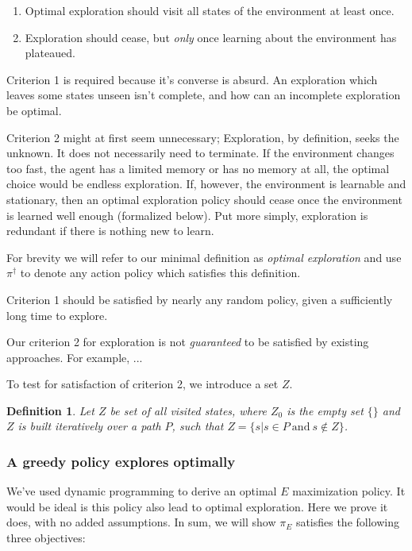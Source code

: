\documentclass[9pt,twocolumn,twoside]{pnas-new}
\newtheorem{definition}{Definition}
\begin{document}
\begin{enumerate}[noitemsep,wide=0pt,leftmargin=\dimexpr\labelwidth+2\labelsep\relax]
    \item Optimal exploration should visit all states of the environment at least once. 
    \item Exploration should cease, but \textit{only} once learning about the environment has plateaued. 
\end{enumerate}

Criterion 1 is required because it's converse is absurd. An exploration which leaves some states unseen isn't complete, and how can an incomplete exploration be optimal.

Criterion 2 might at first seem unnecessary; Exploration, by definition, seeks the unknown. It does not necessarily need to terminate. If the environment changes too fast, the agent has a limited memory or has no memory at all, the optimal choice would be endless exploration. If, however, the environment is learnable and stationary, then an optimal exploration policy should cease once the environment is learned well enough (formalized below). Put more simply, exploration is redundant if there is nothing new to learn.

For brevity we will refer to our minimal definition as \textit{optimal exploration} and use $\pi^{\dagger}$ to denote any action policy which satisfies this definition.

Criterion 1 should be satisfied by nearly any random policy, given a sufficiently long time to explore. %

Our criterion 2 for exploration is not \textit{guaranteed} to be satisfied by existing approaches.  For example, ... %


To test for satisfaction of criterion 2, we introduce a set $Z$. 

\begin{definition}
    Let $Z$ be set of all visited states, where $Z_0$ is the empty set $\{\}$ and $Z$ is built iteratively over a path $P$, such that $Z = \{s | s \in P\ \text{and}\ s \not\in Z\}$.    
\end{definition}

\subsubsection*{A greedy policy explores optimally}
We've used dynamic programming to derive an optimal $E$ maximization policy. It would be ideal is this policy also lead to optimal exploration. Here we prove it does, with no added assumptions. In sum, we will show $\pi_E$ satisfies the following three objectives:
\end{document}

